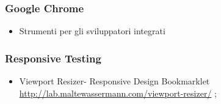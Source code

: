       \subsubsection{Google Chrome}
	\begin{itemize}
	 \item Strumenti per gli sviluppatori integrati 
	\end{itemize}
      \subsubsection{Responsive Testing}
	\begin{itemize}
	 \item Viewport Resizer- Responsive Design Bookmarklet \\
	 \href{http://lab.maltewassermann.com/viewport-resizer/}{http://lab.maltewassermann.com/viewport-resizer/} ;
	\end{itemize}



